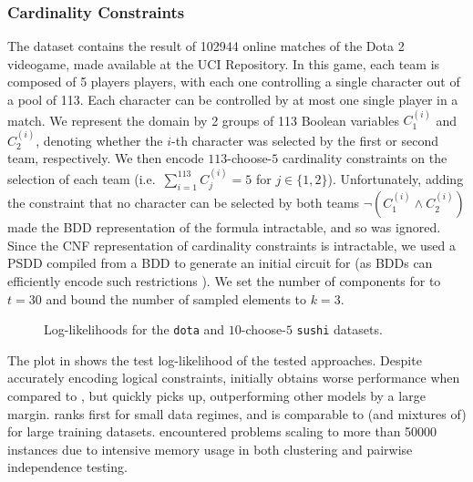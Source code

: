 \subsubsection{Cardinality Constraints}

The  dataset contains the result of \num{102944} online matches of the Dota 2
videogame, made available at the UCI Repository. In this game, each team is composed of 5 players
players, with each one controlling a single character out of a pool of 113. Each character can be
controlled by at most one single player in a match. We represent the domain by 2 groups of 113
Boolean variables $C_1^{(i)}$ and $C_2^{(i)}$, denoting whether the $i$-th character was selected
by the first or second team, respectively. We then encode $113$-choose-$5$ cardinality constraints
on the selection of each team (i.e.\ $\sum_{i=1}^113 C_j^{(i)}=5$ for $j\in\{1,2\}$).
Unfortunately, adding the constraint that no character can be selected by both teams
$\neg(C_1^{(i)}\wedge C_2^{(i)})$ made the BDD representation of the formula intractable, and so
was ignored. Since the CNF representation of cardinality constraints is intractable, we used a PSDD
compiled from a BDD to generate an initial circuit for  (as BDDs can
efficiently encode such restrictions \citep{een06}). We set the number of components for
 to $t=30$ and bound the number of sampled elements to $k=3$.

\begin{figure}[t]
  \begin{subfigure}{0.495\textwidth}
    \caption{}
    \label{fig:ll-dota}
  \end{subfigure}
  \begin{subfigure}{0.495\textwidth}
    \caption{}
    \label{fig:ll-sushi-choose}
  \end{subfigure}
  \caption{Log-likelihoods for the \texttt{dota}  and $10$-choose-$5$ \texttt{sushi}
     datasets.}
  \label{fig:ll-cardinality}
\end{figure}

The plot in  shows the test log-likelihood of the tested approaches. Despite
accurately encoding logical constraints,  initially obtains worse performance
when compared to , but quickly picks up, outperforming other models by a
large margin.  ranks first for small data regimes, and is comparable to
 (and mixtures of) for large training datasets.  encountered
problems scaling to more than \num{50000} instances due to intensive memory usage in both
clustering and pairwise independence testing.

